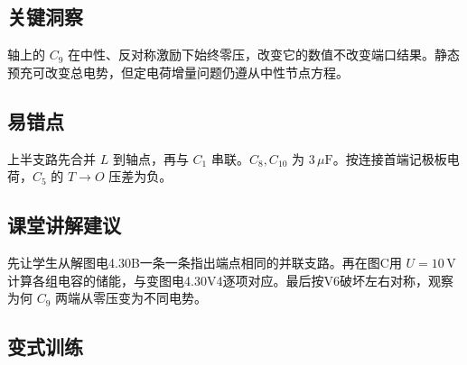 \documentclass[UTF8,fontset=fandol,a4paper,11pt]{ctexart}
\begin{document}


\subsection*{关键洞察}

轴上的 $C_9$ 在中性、反对称激励下始终零压，改变它的数值不改变端口结果。静态预充可改变总电势，但定电荷增量问题仍遵从中性节点方程。



\subsection*{易错点}

上半支路先合并 $L$ 到轴点，再与 $C_1$ 串联。$C_8,C_{10}$ 为 $3\,\mu\mathrm F$。按连接首端记极板电荷，$C_5$ 的 $T\to O$ 压差为负。



\subsection*{课堂讲解建议}

先让学生从解图电4.30B一条一条指出端点相同的并联支路。再在图C用 $U=10\,\mathrm V$ 计算各组电容的储能，与变图电4.30V4逐项对应。最后按V6破坏左右对称，观察为何 $C_9$ 两端从零压变为不同电势。


\subsection*{变式训练}
\end{document}
